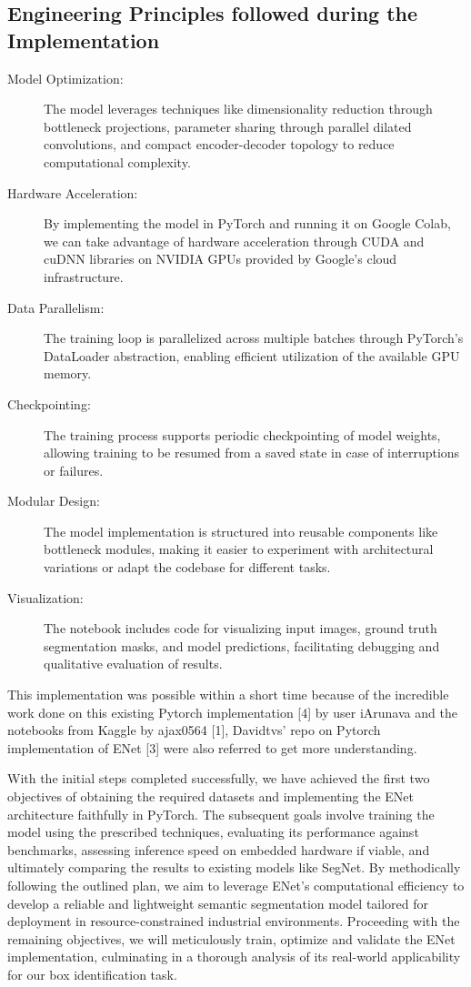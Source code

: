 \subsection{Engineering Principles followed during the Implementation}
\begin{description}
    \item[Model Optimization:] The model leverages techniques like dimensionality reduction through bottleneck projections, parameter sharing through parallel dilated convolutions, and compact encoder-decoder topology to reduce computational complexity.
    \item[Hardware Acceleration:] By implementing the model in PyTorch and running it on Google Colab, we can take advantage of hardware acceleration through CUDA and cuDNN libraries on NVIDIA GPUs provided by Google's cloud infrastructure.
    \item[Data Parallelism:] The training loop is parallelized across multiple batches through PyTorch's DataLoader abstraction, enabling efficient utilization of the available GPU memory.
    \item[Checkpointing:] The training process supports periodic checkpointing of model weights, allowing training to be resumed from a saved state in case of interruptions or failures.
    \item[Modular Design:] The model implementation is structured into reusable components like bottleneck modules, making it easier to experiment with architectural variations or adapt the codebase for different tasks.
    \item[Visualization:] The notebook includes code for visualizing input images, ground truth segmentation masks, and model predictions, facilitating debugging and qualitative evaluation of results.
\end{description}

This implementation was possible within a short time because of the incredible work done on this existing Pytorch implementation [4] by user iArunava and the notebooks from Kaggle by ajax0564 [1], Davidtvs' repo on Pytorch implementation of ENet [3] were also referred to get more understanding.

With the initial steps completed successfully, we have achieved the first two objectives of obtaining the required datasets and implementing the ENet architecture faithfully in PyTorch. The subsequent goals involve training the model using the prescribed techniques, evaluating its performance against benchmarks, assessing inference speed on embedded hardware if viable, and ultimately comparing the results to existing models like SegNet. By methodically following the outlined plan, we aim to leverage ENet's computational efficiency to develop a reliable and lightweight semantic segmentation model tailored for deployment in resource-constrained industrial environments. Proceeding with the remaining objectives, we will meticulously train, optimize and validate the ENet implementation, culminating in a thorough analysis of its real-world applicability for our box identification task.
